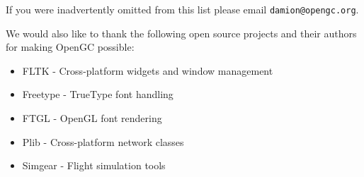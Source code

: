 \documentclass[11pt]{article}
\begin{document}
\noindent If you were inadvertently omitted from this list please email \texttt{damion@opengc.org}.

We would also like to thank the following open source projects and their authors for making OpenGC possible:

\begin{itemize}
\item FLTK - Cross-platform widgets and window management
\item Freetype - TrueType font handling
\item FTGL - OpenGL font rendering
\item Plib - Cross-platform network classes
\item Simgear - Flight simulation tools
\end{itemize}
\end{document}
